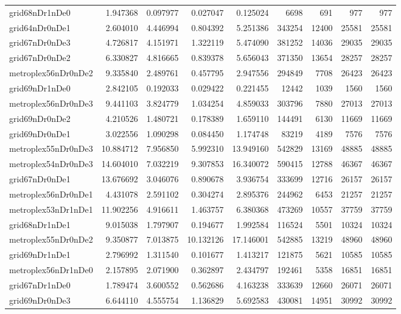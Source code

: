 \begin{longtable}{|l|r|r|r|r|r|r|r|r|}
grid68nDr1nDe0 & 1.947368 & 0.097977 & 0.027047 & 0.125024 & 6698 & 691 & 977 & 977 \\
grid64nDr0nDe1 & 2.604010 & 4.446994 & 0.804392 & 5.251386 & 343254 & 12400 & 25581 & 25581 \\
grid67nDr0nDe3 & 4.726817 & 4.151971 & 1.322119 & 5.474090 & 381252 & 14036 & 29035 & 29035 \\
grid67nDr0nDe2 & 6.330827 & 4.816665 & 0.839378 & 5.656043 & 371350 & 13654 & 28257 & 28257 \\
metroplex56nDr0nDe2 & 9.335840 & 2.489761 & 0.457795 & 2.947556 & 294849 & 7708 & 26423 & 26423 \\
grid69nDr1nDe0 & 2.842105 & 0.192033 & 0.029422 & 0.221455 & 12442 & 1039 & 1560 & 1560 \\
metroplex56nDr0nDe3 & 9.441103 & 3.824779 & 1.034254 & 4.859033 & 303796 & 7880 & 27013 & 27013 \\
grid69nDr0nDe2 & 4.210526 & 1.480721 & 0.178389 & 1.659110 & 144491 & 6130 & 11669 & 11669 \\
grid69nDr0nDe1 & 3.022556 & 1.090298 & 0.084450 & 1.174748 & 83219 & 4189 & 7576 & 7576 \\
metroplex55nDr0nDe3 & 10.884712 & 7.956850 & 5.992310 & 13.949160 & 542829 & 13169 & 48885 & 48885 \\
metroplex54nDr0nDe3 & 14.604010 & 7.032219 & 9.307853 & 16.340072 & 590415 & 12788 & 46367 & 46367 \\
grid67nDr0nDe1 & 13.676692 & 3.046076 & 0.890678 & 3.936754 & 333699 & 12716 & 26157 & 26157 \\
metroplex56nDr0nDe1 & 4.431078 & 2.591102 & 0.304274 & 2.895376 & 244962 & 6453 & 21257 & 21257 \\
metroplex53nDr1nDe1 & 11.902256 & 4.916611 & 1.463757 & 6.380368 & 473269 & 10557 & 37759 & 37759 \\
grid68nDr1nDe1 & 9.015038 & 1.797907 & 0.194677 & 1.992584 & 116524 & 5501 & 10324 & 10324 \\
metroplex55nDr0nDe2 & 9.350877 & 7.013875 & 10.132126 & 17.146001 & 542885 & 13219 & 48960 & 48960 \\
grid69nDr1nDe1 & 2.796992 & 1.311540 & 0.101677 & 1.413217 & 121875 & 5621 & 10585 & 10585 \\
metroplex56nDr1nDe0 & 2.157895 & 2.071900 & 0.362897 & 2.434797 & 192461 & 5358 & 16851 & 16851 \\
grid67nDr1nDe0 & 1.789474 & 3.600552 & 0.562686 & 4.163238 & 333639 & 12660 & 26071 & 26071 \\
grid69nDr0nDe3 & 6.644110 & 4.555754 & 1.136829 & 5.692583 & 430081 & 14951 & 30992 & 30992 \\

\end{longtable}
